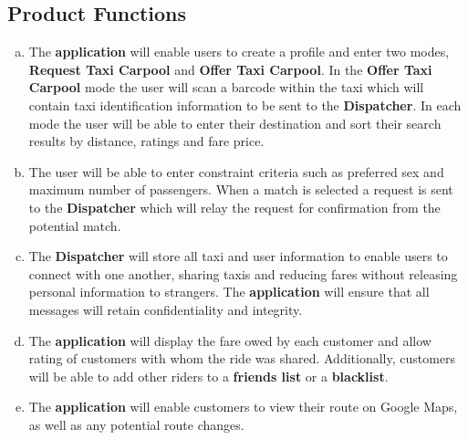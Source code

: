 \documentclass[english]{article}
\begin{document}
\subsection{Product Functions}
\label{sub:product_functions}
\begin{enumerate}[a)]
	\item The \textbf{application} will enable users to create a profile and enter two modes, \textbf{Request Taxi Carpool} and \textbf{Offer Taxi Carpool}. In the \textbf{Offer Taxi Carpool} mode the user will scan a barcode within the taxi which will contain taxi identification information to be sent to the \textbf{Dispatcher}. In each mode the user will be able to enter their destination and sort their search results by distance, ratings and fare price. 
	
	\item The user will be able to enter constraint criteria such as preferred sex and maximum number of passengers. When a match is selected a request is sent to the \textbf{Dispatcher} which will relay the request for confirmation from the potential match. 
	
	\item The \textbf{Dispatcher} will store all taxi and user information to enable users to connect with one another, sharing taxis and reducing fares without releasing personal information to strangers. The \textbf{application} will ensure that all messages will retain confidentiality and integrity.
	
	\item The \textbf{application} will display the fare owed by each customer and allow rating of customers with whom the ride was shared. Additionally, customers will be able to add other riders to a \textbf{friends list} or a \textbf{blacklist}.
	
	\item The \textbf{application} will enable customers to view their route on Google Maps, as well as any potential route changes.
\end{enumerate}
\end{document}
